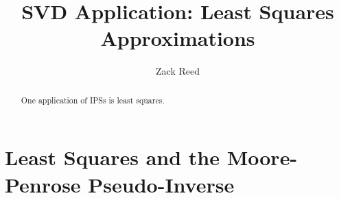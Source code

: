 \documentclass{ximera}
\author{Zack Reed}
\title{SVD Application: Least Squares Approximations}
\begin{document}
\begin{abstract}

    One application of IPSs is least squares.

\end{abstract}
\maketitle


\section*{Least Squares and the Moore-Penrose Pseudo-Inverse}
\label{sec:least-squares}

\end{document}
